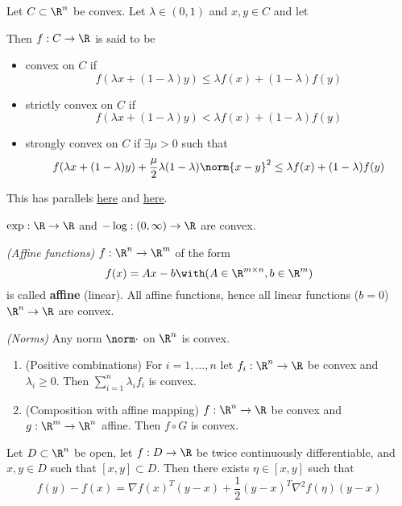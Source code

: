 Let $C\subset\R^n$ be convex. Let $\lambda\in(0,1)$ and $x,y\in C$ and let

Then $f:C\to\R$ is said to be

\begin{itemize}
  \item convex on $C$ if
        $$f(\lambda x+(1-\lambda)y)\leq\lambda f(x)+(1-\lambda)f(y)$$
  \item strictly convex on $C$ if
        $$f(\lambda x+(1-\lambda)y)<\lambda f(x)+(1-\lambda)f(y)$$
  \item strongly convex on $C$ if $\exists\mu>0$ such that
        $$f(\lambda x+(1-\lambda)y)+\frac{\mu}{2}\lambda(1-\lambda)\norm{x-y}^2\leq\lambda f(x)+(1-\lambda)f(y)$$
\end{itemize}

This has parallels \href{cd9cea7}{here} and \href{a8ddd0c}{here}.

\label{f96c8ae}

\begin{enumerata}
  \item $\exp:\R\to\R$ and $-\log:(0,\infty)\to\R$ are convex.
  \item \textit{(Affine functions)} $f:\R^n\to\R^m$ of the form
  $$
    f(x)=Ax-b\with(A\in\R^{m\times n},b\in\R^m)
  $$
  is called \textbf{affine} (linear). All affine functions, hence
  all linear functions ($b=0$) $\R^n\to\R$ are convex.
  \item \textit{(Norms)} Any norm $\norm\cdot$ on $\R^n$ is convex.
\end{enumerata}

\label{ddce2a7}

\begin{enumerate}
  \item (Positive combinations) For $i=1,\ldots,n$ let $f_i:\R^n\to\R$ be
        convex and $\lambda_i\geq0$. Then $\sum_{i=1}^n\lambda_if_i$ is
        convex.
  \item (Composition with affine mapping) $f:\R^n\to\R$ be convex
        and $g:\R^m\to\R^n$ affine. Then $f\circ G$ is convex.
\end{enumerate}

\label{b90111f}

Let $D\subset\R^n$ be open, let $f:D\to\R$ be twice continuously
differentiable, and $x,y\in D$ such that $[x,y]\subset D$. Then there exists
$\eta\in[x,y]$ such that
$$
  f(y)-f(x)=\nabla f(x)^T(y-x)+\frac12(y-x)^T\nabla^2f(\eta)(y-x)
$$

